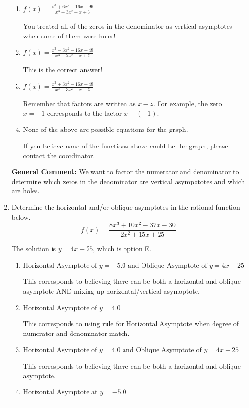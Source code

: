 \documentclass{extbook}[14pt]
\newcommand{\litem}[1]{\item #1

\rule{\textwidth}{0.4pt}}
\begin{document}
\begin{enumerate}
{\begin{enumerate}[label=\Alph*.]
You treated all of the zeros in the denominator as vertical asmptotes when some of them were holes and wrote factors as $x+z$.
\item \( f(x)=\frac{x^{3} +6 x^{2} -16 x -96}{x^{3} -3 x^{2} -x + 3} \)

You treated all of the zeros in the denominator as vertical asymptotes when some of them were holes!
\item \( f(x)=\frac{x^{3} -3 x^{2} -16 x + 48}{x^{3} -3 x^{2} -x + 3} \)

This is the correct answer!
\item \( f(x)=\frac{x^{3} +3 x^{2} -16 x -48}{x^{3} +3 x^{2} -x -3} \)

Remember that factors are written as $x-z$. For example, the zero $x=-1$ corresponds to the factor $x-(-1)$.
\item \( \text{None of the above are possible equations for the graph.} \)

If you believe none of the functions above could be the graph, please contact the coordinator.
\end{enumerate}

\textbf{General Comment:} We want to factor the numerator and denominator to determine which zeros in the denominator are vertical asympototes and which are holes.
}
\litem{
Determine the horizontal and/or oblique asymptotes in the rational function below.
\[ f(x) = \frac{8x^{3} +10 x^{2} -37 x -30}{2x^{2} +15 x + 25} \]

The solution is \( y = 4x -25 \), which is option E.\begin{enumerate}[label=\Alph*.]
\item \( \text{Horizontal Asymptote of } y = -5.0 \text{ and Oblique Asymptote of } y = 4x -25 \)

This corresponds to believing there can be both a horizontal and oblique asymptote AND mixing up horizontal/vertical asymoptote.
\item \( \text{Horizontal Asymptote of } y = 4.0  \)

This corresponds to using rule for Horizontal Asymptote when degree of numerator and denominator match.
\item \( \text{Horizontal Asymptote of } y = 4.0 \text{ and Oblique Asymptote of } y = 4x -25 \)

This corresponds to believing there can be both a horizontal and oblique asymptote.
\item \( \text{Horizontal Asymptote at } y = -5.0 \)


\end{enumerate}}
\end{enumerate}
\end{document}
